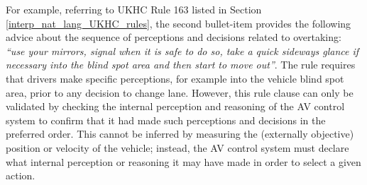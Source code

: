 For example, referring to UKHC Rule 163 listed in Section \ref{interp_nat_lang_UKHC_rules}, the second bullet-item provides the following advice about the sequence of perceptions and decisions related to overtaking: \textit{``use your mirrors, signal when it is safe to do so, take a quick sideways glance if necessary into the blind spot area and then start to move out''}. The rule requires that drivers make specific perceptions, for example into the vehicle blind spot area, prior to any decision to change lane. However, this rule clause can only be validated by checking the internal perception and reasoning of the AV control system to confirm that it had made such perceptions and decisions in the preferred order. This cannot be inferred by measuring the (externally objective) position or velocity of the vehicle; instead, the AV control system must declare what internal perception or reasoning it may have made in order to select a given action.
% 

